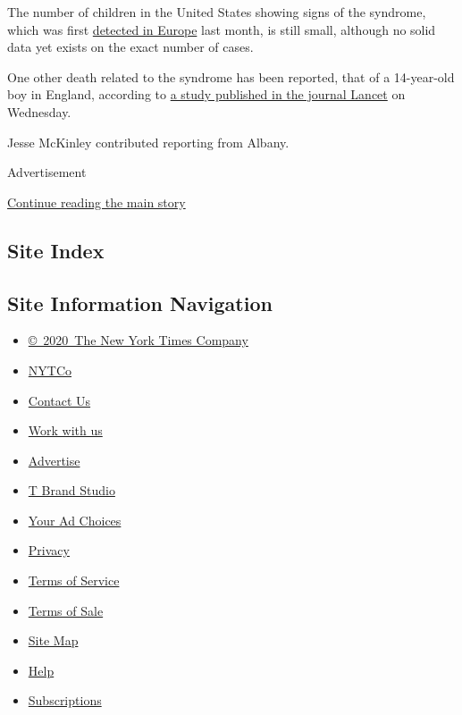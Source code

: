 The number of children in the United States showing signs of the
syndrome, which was first
\href{https://www.nytimes3xbfgragh.onion/aponline/2020/04/28/world/europe/ap-eu-virus-outbreak-kids-rare-syndrome.html}{detected
in Europe} last month, is still small, although no solid data yet exists
on the exact number of cases.

One other death related to the syndrome has been reported, that of a
14-year-old boy in England, according to
\href{https://www.thelancet.com/lancet/article/s0140-6736(20)31094-1}{a
study published in the journal Lancet} on Wednesday.

Jesse McKinley contributed reporting from Albany.

Advertisement

\protect\hyperlink{after-bottom}{Continue reading the main story}

\hypertarget{site-index}{%
\subsection{Site Index}\label{site-index}}

\hypertarget{site-information-navigation}{%
\subsection{Site Information
Navigation}\label{site-information-navigation}}

\begin{itemize}
\tightlist
\item
  \href{https://help.nytimes3xbfgragh.onion/hc/en-us/articles/115014792127-Copyright-notice}{©~2020~The
  New York Times Company}
\end{itemize}

\begin{itemize}
\tightlist
\item
  \href{https://www.nytco.com/}{NYTCo}
\item
  \href{https://help.nytimes3xbfgragh.onion/hc/en-us/articles/115015385887-Contact-Us}{Contact
  Us}
\item
  \href{https://www.nytco.com/careers/}{Work with us}
\item
  \href{https://nytmediakit.com/}{Advertise}
\item
  \href{http://www.tbrandstudio.com/}{T Brand Studio}
\item
  \href{https://www.nytimes3xbfgragh.onion/privacy/cookie-policy\#how-do-i-manage-trackers}{Your
  Ad Choices}
\item
  \href{https://www.nytimes3xbfgragh.onion/privacy}{Privacy}
\item
  \href{https://help.nytimes3xbfgragh.onion/hc/en-us/articles/115014893428-Terms-of-service}{Terms
  of Service}
\item
  \href{https://help.nytimes3xbfgragh.onion/hc/en-us/articles/115014893968-Terms-of-sale}{Terms
  of Sale}
\item
  \href{https://spiderbites.nytimes3xbfgragh.onion}{Site Map}
\item
  \href{https://help.nytimes3xbfgragh.onion/hc/en-us}{Help}
\item
  \href{https://www.nytimes3xbfgragh.onion/subscription?campaignId=37WXW}{Subscriptions}
\end{itemize}
